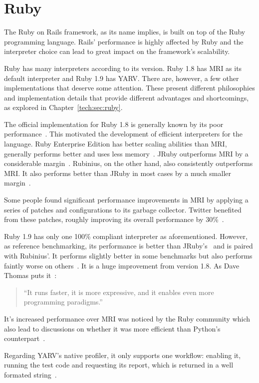 \section{Ruby} %
\label{state:sec:ruby}
The Ruby on Rails framework, as its name implies, is built on top of the Ruby programming language. Rails' performance is highly affected by Ruby and the interpreter choice can lead to great impact on the framework's scalability.

Ruby has many interpreters according to its version. Ruby 1.8 has MRI as its default interpreter and Ruby 1.9 has YARV. There are, however, a few other implementations that deserve some attention. These present different philosophies and implementation details that provide different advantages and shortcomings, as explored in Chapter~\ref{tech:sec:ruby}.

The official implementation for Ruby 1.8 is generally known by its poor performance~\cite{6tips_for_mri}. This motivated the development of efficient interpreters for the language. Ruby Enterprise Edition has better scaling abilities than MRI, generally performs better and uses less memory~\cite{ree_benchmarks}. JRuby outperforms MRI by a considerable margin~\cite{ruby19_performance}. Rubinius, on the other hand, also consistently outperforms MRI. It also performs better than JRuby in most cases by a much smaller margin~\cite{rvm_rubinius_benchmarks}.

Some people found significant performance improvements in MRI by applying a series of patches and configurations to its garbage collector. Twitter benefited from these patches, roughly improving its overall performance by 30\%~\cite{ruby_gc_tuning}.

Ruby 1.9 has only one 100\% compliant interpreter as aforementioned. However, as reference benchmarking, its performance is better than JRuby's~\cite{ruby19_performance} and is paired with Rubinius'. It performs slightly better in some benchmarks but also performs faintly worse on others~\cite{rvm_rubinius_benchmarks,ruby_interpreter_benchmarks}. It is a huge improvement from version 1.8. As Dave Thomas puts it~\cite{programming_ruby_19}:
\begin{quote}
  ``It runs faster, it is more expressive, and it enables even more programming paradigms.''
\end{quote}
It's increased performance over MRI was noticed by the Ruby community which also lead to discussions on whether it was more efficient than Python's counterpart~\cite{ruby19_python}.

Regarding YARV's native profiler, it only supports one workflow: enabling it, running the test code and requesting its report, which is returned in a well formated string~\cite{yarv_gc_profiler}.

